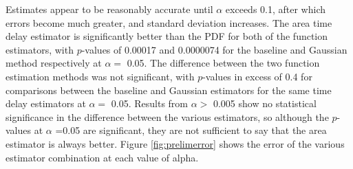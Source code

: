 \documentclass[a4paper,11pt]{article}
\begin{document}
Estimates appear to be reasonably accurate until $\alpha$ exceeds 0.1, after
which errors become much greater, and standard deviation increases. The area
time delay estimator is significantly better than the PDF for both of the
function estimators, with $p$-values of 0.00017 and 0.0000074 for the baseline
and Gaussian method respectively at $\alpha=$ 0.05. The difference between the
two function estimation methods was not significant, with $p$-values in excess
of 0.4 for comparisons between the baseline and Gaussian estimators for the same
time delay estimators at $\alpha=$ 0.05. Results from $\alpha>$ 0.005 show no
statistical significance in the difference between the various estimators, so
although the $p$-values at $\alpha$ =0.05 are significant, they are not
sufficient to say that the area estimator is always better. Figure
\ref{fig:prelimerror} shows the error of the various estimator combination at
each value of alpha.
\end{document}
